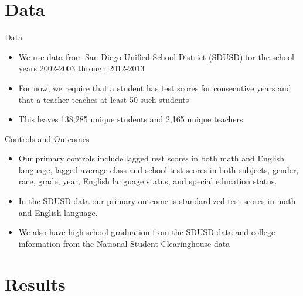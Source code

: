 \documentclass[11pt]{beamer}
\begin{document}
\section{Data}


\begin{frame}{Data}

    \begin{itemize}
        \item We use data from San Diego Unified School District (SDUSD) for the school years 2002-2003 through 2012-2013
        \item For now, we require that a student has test scores for consecutive years and that a teacher teaches at least 50 such students
        \item This leaves 138,285 unique students and 2,165 unique teachers
    \end{itemize}

\end{frame}


\begin{frame}{Controls and Outcomes}


    \begin{itemize}
        \item Our primary controls include lagged rest scores in both math and English language, lagged average class and school test scores in both subjects, gender, race, grade, year, English language status, and special education status.
        \item In the SDUSD data our primary outcome is standardized test scores in math and English language.
        \item We also have high school graduation from the SDUSD data and college information from the National Student Clearinghouse data
    \end{itemize}

\end{frame}





\section{Results}
\end{document}
